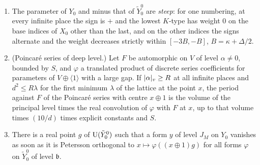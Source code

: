 \begin{proposition}\label{prop:deep-level}
\begin{enumerate}[label=\textup{(\alph*)}]
\item The parameter of $Y_0$ and minus that of $\tilde Y^0_0$ are \emph{steep}: for one numbering, at every infinite place the sign is $+$ and the lowest $K$-type has weight $0$ on the base indices of $X_0$
other than the last, and on the other indices the signs alternate and the weight decreases strictly within $[-3B,-B]$, $B=\kappa+\Delta/2$.
\item (Poincar\'e series of deep level.) Let $F$ be automorphic on $V$ of level $\alpha\ne0$, bounded by $S$, and $\varphi$ a translated product of discrete series coefficients for parameters of $V\oplus\langle1\rangle$ with a large
gap. If $\lvert \alpha\rvert_v\ge R$ at all infinite places and $d^2\le R\lambda$ for the first minimum $\lambda$ of the lattice at the point $x$, the period against $F$ of the Poincar\'e series with centre $x\oplus1$ is the volume of the
principal level times the real convolution of $\varphi$ with $F$ at $x$, up to that volume times $(10/d)$ times explicit constants and $S$.
\item There is a real point $g$ of $\operatorname{U}(\tilde Y^0_0)$ such that a form $y$ of level $J_M$ on $Y_0$ vanishes as soon as it is Petersson orthogonal to $x\mapsto\varphi((x\oplus1)g)$ for all forms $\varphi$ on $\tilde Y^0_0$ of
level $\mathfrak b$.
\end{enumerate}
\end{proposition}

